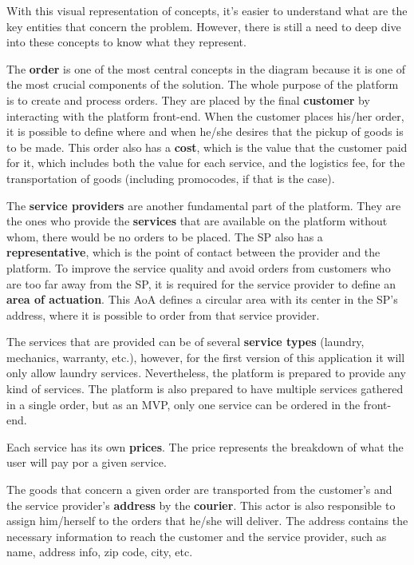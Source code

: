 \par
With this visual representation of concepts, it's easier to understand what are the key entities that concern the problem. However, there is still a need to deep dive into these concepts to know what they represent.

\par

The \textbf{order} is one of the most central concepts in the diagram because it is one of the most crucial components of the solution. The whole purpose of the platform is to create and process orders. They are placed by the final \textbf{customer} by interacting with the platform front-end. When the customer places his/her order, it is possible to define where and when he/she desires that the pickup of goods is to be made. This order also has a \textbf{cost}, which is the value that the customer paid for it, which includes both the value for each service, and the logistics fee, for the transportation of goods (including promocodes, if that is the case).
\par
The \textbf{service providers} are another fundamental part of the platform. They are the ones who provide the \textbf{services} that are available on the platform without whom, there would be no orders to be placed. The \gls{SP} also has a \textbf{representative}, which is the point of contact between the provider and the platform. To improve the service quality and avoid orders from customers who are too far away from the \gls{SP}, it is required for the service provider to define an \textbf{area of actuation}. This \gls{AoA} defines a circular area with its center in the \gls{SP}'s address, where it is possible to order from that service provider.
\par
The services that are provided can be of several \textbf{service types} (laundry, mechanics, warranty, etc.), however, for the first version of this application it will only allow laundry services. Nevertheless, the platform is prepared to provide any kind of services. The platform is also prepared to have multiple services gathered in a single order, but as an \gls{MVP}, only one service can be ordered in the front-end.
\par
Each service has its own \textbf{prices}. The price represents the breakdown of what the user will pay por a given service. 
\par

The goods that concern a given order are transported from the customer's and the service provider's \textbf{address} by the \textbf{courier}. This actor is also responsible to assign him/herself to the orders that he/she will deliver. The address contains the necessary information to reach the customer and the service provider, such as name, address info, zip code, city, etc.

